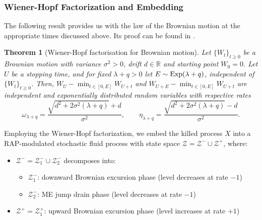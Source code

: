 \documentclass[a4paper,11pt]{article}
\numberwithin{equation}{section}
\theoremstyle{plain}
\newtheorem{theorem}{Theorem}[section]
\theoremstyle{definition}
\newcommand{\1}{\mathbf{1}}
\begin{document}
\subsubsection{Wiener-Hopf Factorization and Embedding}

The following result provides us with the law of the Brownian motion at the appropriate times discussed above. 
Its proof can be found in \cite{BladtNielsen2017}. 

\begin{theorem}[Wiener-Hopf factorisation for Brownian motion]
Let $\{W_t\}_{t\geq 0}$ be a Brownian motion with variance $\sigma^2>0$, drift $d\in \mathbb{R}$ and starting point $W_0=0$. 
Let $U$ be a stopping time, and for fixed $\lambda+q > 0$ let $E\sim {\rm Exp}(\lambda+q)$, independent of $\{W_t\}_{t\geq 0}$. 
Then, $W_U-\min_{t\in [0,E]}W_{U+t}$ and $W_{U+E}-\min_{t\in [0,E]}W_{U+t}$ are independent and exponentially distributed random variables with respective rates
\begin{equation}\label{eq:wiener_hopf_factors}
\omega_{\lambda+q} = \frac{\sqrt{d^2 + 2\sigma^2 (\lambda+q)} + d}{\sigma^2}, \qquad \eta_{\lambda+q} = \frac{\sqrt{d^2 + 2\sigma^2 (\lambda+q)} - d}{\sigma^2}.
\end{equation}
\end{theorem}

Employing the Wiener-Hopf factorization, we embed the killed process $X$ into a RAP-modulated stochastic fluid process with state space $\mathcal{Z} = \mathcal{Z}^- \cup \mathcal{Z}^+$, where:
\begin{itemize}
\item $\mathcal{Z}^- = \mathcal{Z}_1^- \cup \mathcal{Z}_2^-$ decomposes into:
\begin{itemize}
\item[1)] $\mathcal{Z}_1^-$: downward Brownian excursion phase (level decreases at rate $-1$)
\item[2)] $\mathcal{Z}_2^-$: ME jump drain phase (level decreases at rate $-1$)
\end{itemize}
\item $\mathcal{Z}^+ = \mathcal{Z}_1^+$: upward Brownian excursion phase (level increases at rate $+1$)
\end{itemize}
\end{document}
